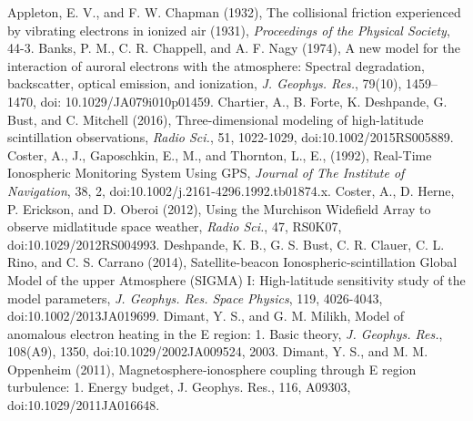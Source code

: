\documentclass[letterpaper,12pt]{article}
\begin{document}
\newpage

\begin{thebibliography}{99}
\small
{}
Appleton, E. V., and F. W. Chapman (1932), The collisional friction experienced by vibrating electrons in ionized air (1931), \emph{Proceedings of the Physical Society}, 44-3.
\vspace{-1em}
Banks, P. M., C. R. Chappell, and A. F. Nagy (1974), A new model for the interaction of auroral electrons with the atmosphere: Spectral degradation, backscatter, optical emission, and ionization, \emph{J. Geophys. Res.}, 79(10), 1459–1470, doi: 10.1029/JA079i010p01459. 
\vspace{-1em}
Chartier, A., B. Forte, K. Deshpande, G. Bust, and C. Mitchell (2016), Three-dimensional modeling of high-latitude scintillation observations, \textit{Radio Sci.}, 51, 1022-1029, doi:10.1002/2015RS005889.
\vspace{-1em}
Coster, A., J., Gaposchkin, E., M., and Thornton, L., E., (1992), Real-Time Ionospheric Monitoring System Using GPS, \textit{Journal of The Institute of Navigation}, 38, 2, doi:10.1002/j.2161-4296.1992.tb01874.x.
\vspace{-1em}
Coster, A., D. Herne, P. Erickson, and D. Oberoi (2012), Using the Murchison Widefield Array to observe midlatitude space weather, \emph{Radio Sci.}, 47, RS0K07, doi:10.1029/2012RS004993.
\vspace{-1em}
Deshpande, K. B., G. S. Bust, C. R. Clauer, C. L. Rino, and C. S. Carrano (2014), Satellite-beacon Ionospheric-scintillation Global Model of the upper Atmosphere (SIGMA) I: High-latitude sensitivity study of the model parameters, \emph{J. Geophys. Res. Space Physics}, 119, 4026-4043, doi:10.1002/2013JA019699.
\vspace{-1em}
Dimant, Y. S., and G. M. Milikh, Model of anomalous electron heating in the E region: 1. Basic theory, \emph{J. Geophys. Res.}, 108(A9), 1350, doi:10.1029/2002JA009524, 2003.
\vspace{-1em}
Dimant, Y. S., and M. M. Oppenheim (2011), Magnetosphere‐ionosphere coupling through E region turbulence:
1. Energy budget, J. Geophys. Res., 116, A09303, doi:10.1029/2011JA016648.

\end{thebibliography}
\end{document}
